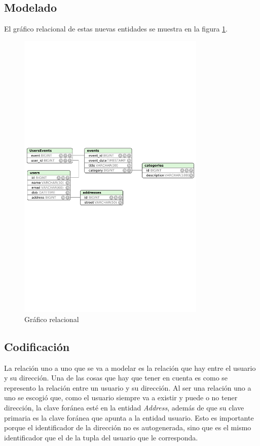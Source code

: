 \documentclass{article}
\begin{document}
\subsection{Modelado}

	El gráfico relacional de estas nuevas entidades se muestra en la figura \ref{fig:c07:ER}.
\begin{figure}[h]
  \centering
    \includegraphics[width=0.8\textwidth]{commit07/img/ER.pdf}
  \caption{Gráfico relacional}
  \label{fig:c07:ER}
\end{figure}	

\subsection{Codificación}
	La relación uno a uno que se va a modelar es la relación que hay entre el usuario y su dirección. Una de las cosas que hay que tener en cuenta es como se represento la relación entre un usuario y su dirección. Al ser una relación uno a uno se escogió que, como el usuario siempre va a existir y puede o no tener dirección, la clave foránea esté en la entidad \emph{Address}, además de que su clave primaria es la clave foránea que apunta a la entidad usuario. Esto es importante porque el identificador de la dirección no es autogenerada, sino que es el mismo identificador que el de la tupla del usuario que le corresponda.

\end{document}
